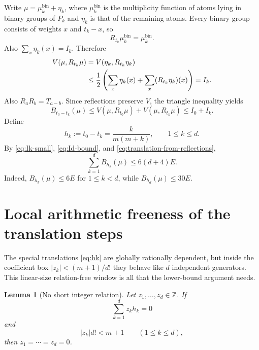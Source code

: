 \documentclass[11pt]{article}
\newtheorem{lemma}[theorem]{Lemma}
\theoremstyle{definition}
\newcommand{\Z}{\mathbb{Z}}
\newcommand{\1}{\mathbf{1}}
\begin{document}
Write $\mu=\mu_k^{\mathrm{bin}}+\eta_k$, where $\mu_k^{\mathrm{bin}}$ is the multiplicity function of atoms lying in binary groups of $P_k$ and $\eta_k$ is that of the remaining atoms.  Every binary group consists of weights $x$ and $t_k-x$, so
\[
  R_{t_k}\mu_k^{\mathrm{bin}}=\mu_k^{\mathrm{bin}}.
\]
Also $\sum_x\eta_k(x)=I_k$.  Therefore
\begin{align}
  V(\mu,R_{t_k}\mu)
  &=V(\eta_k,R_{t_k}\eta_k)\notag\\
  &\le\frac12\left(\sum_x\eta_k(x)+\sum_x(R_{t_k}\eta_k)(x)\right)
  =I_k.\label{eq:reflection-defect}
\end{align}
Also $R_aR_b=T_{a-b}$.  Since reflections preserve $V$, the triangle inequality yields
\begin{equation}\label{eq:translation-from-reflections}
  B_{t_0-t_k}(\mu)
  \le V(\mu,R_{t_0}\mu)+V(\mu,R_{t_k}\mu)
  \le I_0+I_k.
\end{equation}
Define
\begin{equation}\label{eq:hk}
  h_k:=t_0-t_k=\frac{k}{m(m+k)},\qquad 1\le k\le d.
\end{equation}
By \eqref{eq:Ik-small}, \eqref{eq:Id-bound}, and \eqref{eq:translation-from-reflections},
\begin{equation}\label{eq:sum-defect-upper}
  \sum_{k=1}^d B_{h_k}(\mu)
  \le 6(d+4)E.
\end{equation}
Indeed, $B_{h_k}(\mu)\le6E$ for $1\le k<d$, while $B_{h_d}(\mu)\le30E$.

\section{Local arithmetic freeness of the translation steps}

The special translations \eqref{eq:hk} are globally rationally dependent, but inside the coefficient box $|z_k|<(m+1)/d!$ they behave like $d$ independent generators.  This linear-size relation-free window is all that the lower-bound argument needs.

\begin{lemma}[No short integer relation]\label{lem:no-short-relation}
Let $z_1,\ldots,z_d\in\Z$.  If
\begin{equation}\label{eq:relation}
  \sum_{k=1}^d z_kh_k=0
\end{equation}
and
\begin{equation}\label{eq:shortness}
  |z_k|d!<m+1\qquad(1\le k\le d),
\end{equation}
then $z_1=\cdots=z_d=0$.
\end{lemma}
\end{document}
